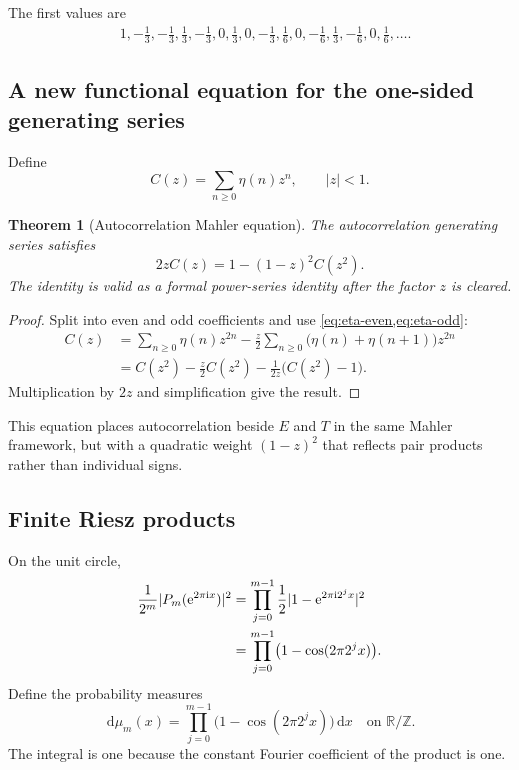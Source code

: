 \documentclass[11pt,oneside]{article}
\newtheorem{theorem}{Theorem}[section]
\theoremstyle{definition}
\theoremstyle{remark}
\newcommand{\R}{\mathbb R}
\newcommand{\Z}{\mathbb Z}
\newcommand{\e}{\mathrm e}
\newcommand{\ii}{\mathrm i}
\newcommand{\dd}{\,\mathrm d}
\begin{document}
The first values are
\begin{align*}
 &1,-\tfrac13,-\tfrac13,\tfrac13,-\tfrac13,0,\tfrac13,0,
 -\tfrac13,\tfrac16,0,-\tfrac16,\tfrac13,-\tfrac16,0,\tfrac16,\ldots.
\end{align*}

\subsection{A new functional equation for the one-sided generating series}

Define
\begin{equation}\label{eq:C-definition}
 C(z)=\sum_{n\ge0}\eta(n)z^n,
 \qquad |z|<1.
\end{equation}

\begin{theorem}[Autocorrelation Mahler equation]\label{thm:C-functional}
The autocorrelation generating series satisfies
\begin{equation}\label{eq:C-functional}
 \boxed{\qquad
 2zC(z)=1-(1-z)^2C(z^2).
 \qquad}
\end{equation}
The identity is valid as a formal power-series identity after the factor $z$
is cleared.
\end{theorem}

\begin{proof}
Split into even and odd coefficients and use
\cref{eq:eta-even,eq:eta-odd}:
\begin{align*}
 C(z)
 &=\sum_{n\ge0}\eta(n)z^{2n}
 -\frac z2\sum_{n\ge0}\bigl(\eta(n)+\eta(n+1)\bigr)z^{2n}\\
 &=C(z^2)-\frac z2C(z^2)
   -\frac1{2z}\bigl(C(z^2)-1\bigr).
\end{align*}
Multiplication by $2z$ and simplification give the result.
\end{proof}

This equation places autocorrelation beside $E$ and $T$ in the same Mahler
framework, but with a quadratic weight $(1-z)^2$ that reflects pair products
rather than individual signs.

\subsection{Finite Riesz products}

On the unit circle,
\begin{align}
 \frac1{2^m}|P_m(\e^{2\pi\ii x})|^2
 &=\prod_{j=0}^{m-1}\frac12
   |1-\e^{2\pi\ii2^jx}|^2\notag\\
 &=\prod_{j=0}^{m-1}
   \bigl(1-\cos(2\pi2^jx)\bigr).
 \label{eq:Riesz-density}
\end{align}
Define the probability measures
\begin{equation}\label{eq:Riesz-measures}
 \dd\mu_m(x)=
 \prod_{j=0}^{m-1}\bigl(1-\cos(2\pi2^jx)\bigr)\dd x
 \quad\text{on }\R/\Z.
\end{equation}
The integral is one because the constant Fourier coefficient of the product is
one.
\end{document}
